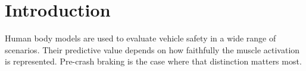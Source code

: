 
\section{Introduction}
\label{sec:introduction}

Human body models are used to evaluate vehicle safety in a wide range of scenarios.
Their predictive value depends on how faithfully the muscle activation is represented.
Pre-crash braking is the case where that distinction matters most.
